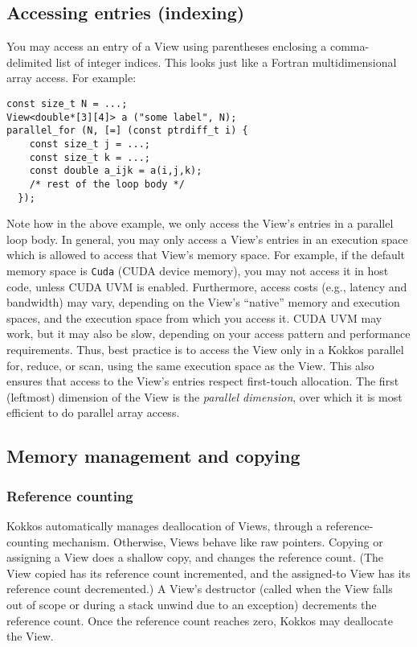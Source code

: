 \subsection{Accessing entries (indexing)}

You may access an entry of a View using parentheses enclosing a
comma-delimited list of integer indices.  This looks just like a
Fortran multidimensional array access.  For example:
\begin{lstlisting}
const size_t N = ...;
View<double*[3][4]> a ("some label", N);
parallel_for (N, [=] (const ptrdiff_t i) {
    const size_t j = ...;
    const size_t k = ...;
    const double a_ijk = a(i,j,k);
    /* rest of the loop body */
  });
\end{lstlisting}
Note how in the above example, we only access the View's entries in a
parallel loop body.  In general, you may only access a View's entries
in an execution space which is allowed to access that View's memory
space.  For example, if the default memory space is \lstinline!Cuda!
(CUDA device memory), you may not access it in host code, unless CUDA
UVM is enabled.  Furthermore, access costs (e.g., latency and
bandwidth) may vary, depending on the View's ``native'' memory and
execution spaces, and the execution space from which you access it.
CUDA UVM may work, but it may also be slow, depending on your access
pattern and performance requirements.  Thus, best practice is to
access the View only in a Kokkos parallel for, reduce, or scan, using
the same execution space as the View.  This also ensures that access
to the View's entries respect first-touch allocation.  The first
(leftmost) dimension of the View is the \emph{parallel dimension},
over which it is most efficient to do parallel array access.

\subsection{Memory management and copying}

\subsubsection{Reference counting}

Kokkos automatically manages deallocation of Views, through a
reference-counting mechanism.  Otherwise, Views behave like raw
pointers.  Copying or assigning a View does a shallow copy, and
changes the reference count.  (The View copied has its reference count
incremented, and the assigned-to View has its reference count
decremented.)  A View's destructor (called when the View falls out of
scope or during a stack unwind due to an exception) decrements the
reference count.  Once the reference count reaches zero, Kokkos may
deallocate the View.

